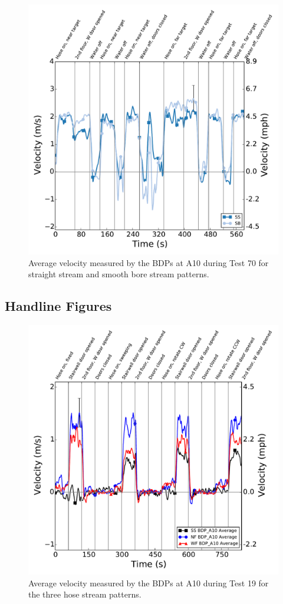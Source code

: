 \documentclass[12pt,oneside]{book}
\begin{document}
\begin{figure}[!ht]
	\includegraphics[width=\columnwidth]{../Figures/Plots/Test_70_West_101215_BDP_A10_stream_avgs}
	\caption{Average velocity measured by the BDPs at A10 during Test 70 for straight stream and smooth bore stream patterns.}
	\label{fig:Test_70_BDP_A10_Avg_All}
	\end{figure}
\FloatBarrier

\subsection{Handline Figures}
\label{sec:handline_figs}

\begin{figure}[!ht]
	\includegraphics[width=\columnwidth]{../Figures/Plots/Test_19_West_063014_BDP_A10_stream_avgs}
	\caption{Average velocity measured by the BDPs at A10 during Test 19 for the three hose stream patterns.}
	\label{fig:Test_19_BDP_A10_Avg_All}
\end{figure}

\clearpage
\end{document}
